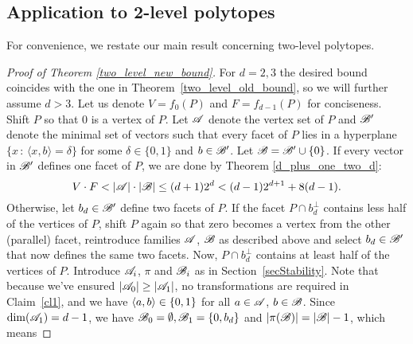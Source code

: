 \subsection{Application to \textbf{2}-level polytopes} \label{sec2level}
For convenience, we restate our main result concerning two-level polytopes.
\twoLevelNew*



\begin{proof}[Proof of Theorem \ref{two_level_new_bound}]
For $d=2,3$ the desired bound coincides with the one in Theorem~\ref{two_level_old_bound}, so we will further assume $d>3$. Let us denote $V=f_0(P)$ and $F=f_{d-1}(P)$ for conciseness. Shift $P$ so that $0$ is a vertex of $P$. Let ${\mathscr{A}}$ denote the vertex set of $P$ and ${\mathscr{B}}'$ denote the minimal set of vectors such that every facet of $P$ lies in a hyperplane $\{x\,:\,\langle x,b \rangle = \delta \}$ for some $\delta\in\{0,1\}$ and $b\in{\mathscr{B}}'$. Let ${\mathscr{B}} = {\mathscr{B}}' \cup \{0\}$.
    If every vector in ${\mathscr{B}}'$ defines one facet of $P$, we are done by Theorem \ref{d_plus_one_two_d}: 
    \[V\cdot F < \left|{\mathscr{A}}\right|\cdot\left|{\mathscr{B}}\right| \leq (d+1)2^d<(d-1)2^{d+1}+8(d-1).\]
    Otherwise, let $b_d\in{\mathscr{B}}'$ define two facets of $P$. If the facet $P\cap b_d^{\bot}$ contains less half of the vertices of $P$, shift $P$ again so that zero becomes a vertex from the other (parallel) facet, reintroduce families ${\mathscr{A}}$, ${\mathscr{B}}$ as described above and select $b_d\in{\mathscr{B}}'$ that now defines the same two facets. %
    Now, $P\cap b_d^{\bot}$ contains at least half of the vertices of $P$. Introduce ${\mathscr{A}}_i$, $\pi$ and ${\mathscr{B}}_i$ as in Section~\ref{secStability}. Note that because we've ensured $|{\mathscr{A}}_0|\geq|{\mathscr{A}}_1|$, no transformations are required in Claim~\ref{cl1}, and we have $\langle a, b\rangle \in \{0,1\}$ for all $a\in{\mathscr{A}}$, $b\in{\mathscr{B}}$.
    Since $\operatorname{dim}({\mathscr{A}}_1)=d-1$, we have ${\mathscr{B}}_0 = \emptyset, {\mathscr{B}}_1=\{0,b_d\}$ and $\left|\pi({\mathscr{B}})\right|=\left|{\mathscr{B}}\right|-1$, which means 

\end{proof}
